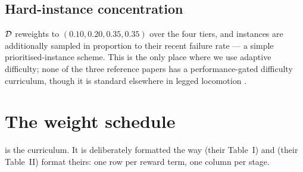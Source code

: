 \documentclass[11pt,a4paper]{article}
\begin{document}
\subsection{Hard-instance concentration}

$\mathcal{D}$ reweights to $(0.10, 0.20, 0.35, 0.35)$ over the four tiers, and instances are
additionally sampled in proportion to their recent failure rate --- a simple
prioritised-instance scheme. This is the only place where we use adaptive difficulty; none
of the three reference papers has a performance-gated difficulty curriculum, though it is
standard elsewhere in legged locomotion \cite{rudin2022,narvekar2020curriculum}.

\section{The weight schedule}

 is the curriculum. It is deliberately formatted the way
\citet{wang2025dribble} (their Table~I) and \citet{xu2025striker} (their Table~II) format
theirs: one row per reward term, one column per stage.
\end{document}
